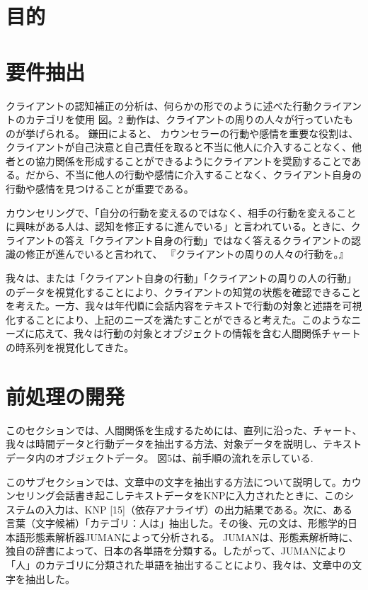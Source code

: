 \documentclass[shuuron]{kuee}
\begin{document}
	\section{目的}


\section{要件抽出}

クライアントの認知補正の分析は、何らかの形でのように述べた行動クライアントのカテゴリを使用 図。2 動作は、クライアントの周りの人々が行っていたものが挙げられる。 鎌田によると\cite{kamata2002}、 カウンセラーの行動や感情を重要な役割は、クライアントが自己決意と自己責任を取ると不当に他人に介入することなく、他者との協力関係を形成することができるようにクライアントを奨励することである。だから、不当に他人の行動や感情に介入することなく、クライアント自身の行動や感情を見つけることが重要である。

  カウンセリングで、「自分の行動を変えるのではなく、相手の行動を変えることに興味がある人は、認知を修正するに進んでいる」と言われている。ときに、クライアントの答え「クライアント自身の行動」ではなく答えるクライアントの認識の修正が進んでいると言われて、 『クライアントの周りの人々の行動を。』

  我々は、または「クライアント自身の行動」「クライアントの周りの人の行動」のデータを視覚化することにより、クライアントの知覚の状態を確認できることを考えた。一方、我々は年代順に会話内容をテキストで行動の対象と述語を可視化することにより、上記のニーズを満たすことができると考えた。このようなニーズに応えて、我々は行動の対象とオブジェクトの情報を含む人間関係チャートの時系列を視覚化してきた。



\section{前処理の開発}

  このセクションでは、人間関係を生成するためには、直列に沿った、チャート、我々は時間データと行動データを抽出する方法、対象データを説明し、テキストデータ内のオブジェクトデータ。 図5は、前手順の流れを示している.

  このサブセクションでは、文章中の文字を抽出する方法について説明して。カウンセリング会話書き起こしテキストデータをKNPに入力されたときに、このシステムの入力は、KNP [15]（依存アナライザ）の出力結果である。次に、ある言葉（文字候補）「カテゴリ：人は」抽出した。その後、元の文は、形態学的日本語形態素解析器JUMAN\cite{juman}によって分析される。 JUMANは、形態素解析時に、独自の辞書によって、日本の各単語を分類する。したがって、JUMANにより「人」のカテゴリに分類された単語を抽出することにより、我々は、文章中の文字を抽出した。
\end{document}
